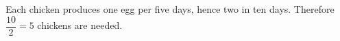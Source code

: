 Each chicken produces one egg per five days, hence two in ten days. Therefore $\dfrac{10}{2}=\boxed5$ chickens are needed.
